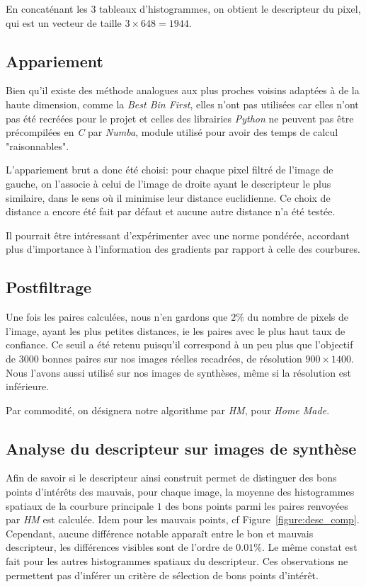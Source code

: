 \documentclass[
	a4paper, %
	10pt, %
	unnumberedsections, %
	twoside, %
]{LTJournalArticle}
\begin{document}
En concaténant les $3$ tableaux d'histogrammes, on obtient le descripteur du pixel,
qui est un vecteur de taille $3 \times 648 = 1944$.


\subsection{Appariement}

Bien qu'il existe des méthode analogues aux plus proches voisins adaptées à de la haute dimension,
comme la \textit{Best Bin First}, elles n'ont pas utilisées car elles n'ont
pas été recréées pour le projet et celles des librairies \textit{\textit{Python}} ne peuvent pas être
précompilées en \textit{C} par \textit{Numba}, module utilisé pour avoir des temps
de calcul "raisonnables".

L'appariement brut a donc été choisi: pour chaque pixel filtré de l'image de gauche,
on l'associe à celui de l'image de droite ayant le descripteur le plus similaire,
dans le sens où il minimise leur distance euclidienne.
Ce choix de distance a encore été fait par défaut et aucune autre distance
n'a été testée.

Il pourrait être intéressant d'expérimenter avec une norme pondérée, accordant plus d'importance
à l'information des gradients par rapport à celle des courbures.

\subsection{Postfiltrage}
Une fois les paires calculées, nous n'en gardons que $2 \%$ du nombre de pixels de l'image,
ayant les plus petites distances, ie les paires avec le plus haut taux
de confiance. Ce seuil a été retenu puisqu'il correspond à un peu plus que
l'objectif de $3000$ bonnes paires sur nos images réelles recadrées, de résolution
$900 \times 1400$.
Nous l'avons aussi utilisé sur nos images de synthèses, même si la résolution est inférieure.

Par commodité, on désignera notre algorithme
par \textit{HM}, pour \textit{Home Made}.

\subsection{Analyse du descripteur sur images de synthèse}

Afin de savoir si le descripteur ainsi construit permet de distinguer
des bons points d'intérêts des mauvais,
pour chaque image, la moyenne des histogrammes spatiaux de
la courbure principale $1$ des bons points parmi les paires
renvoyées par \textit{HM} est calculée. Idem pour les mauvais points, cf Figure~\ref{figure:desc_comp}.
Cependant, aucune différence notable apparaît entre le bon et mauvais descripteur,
les différences visibles sont de l'ordre de $0.01 \%$.
Le même constat est fait pour les autres histogrammes spatiaux du
descripteur. Ces observations ne
permettent pas d'inférer un critère de sélection de bons points d'intérêt.
\end{document}
